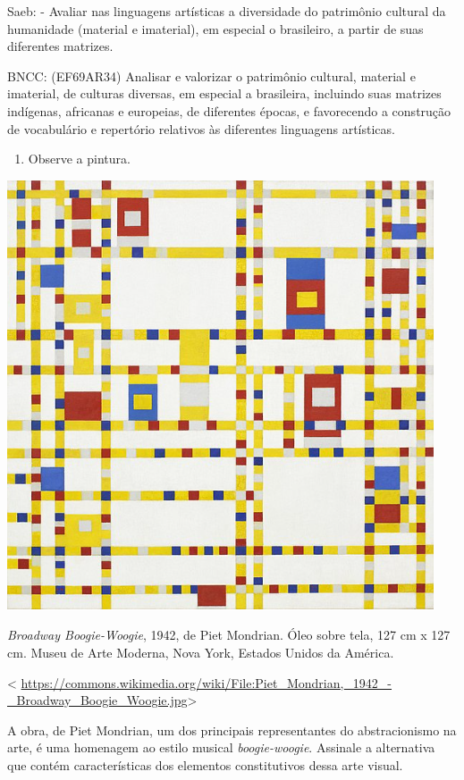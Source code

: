 \begin{escolha}
{{{{{{{{Saeb: - Avaliar nas linguagens artísticas a diversidade do patrimônio
cultural da humanidade (material e imaterial), em especial o brasileiro,
a partir de suas diferentes matrizes.

BNCC: (EF69AR34) Analisar e valorizar o patrimônio cultural, material e
imaterial, de culturas diversas, em especial a brasileira, incluindo
suas matrizes indígenas, africanas e europeias, de diferentes épocas, e
favorecendo a construção de vocabulário e repertório relativos às
diferentes linguagens artísticas.

\begin{enumerate}
\def\labelenumi{\arabic{enumi}.}
\item
  Observe a pintura.
\end{enumerate}

\includegraphics[width=4.96875in,height=5.01042in]{media/image40.png}

\emph{Broadway Boogie-Woogie}, 1942, de Piet Mondrian. Óleo sobre tela,
127 cm x 127 cm. Museu de Arte Moderna, Nova York, Estados Unidos da
América.

\textless{}
\url{https://commons.wikimedia.org/wiki/File:Piet_Mondrian,_1942_-_Broadway_Boogie_Woogie.jpg}\textgreater{}

A obra, de Piet Mondrian, um dos principais representantes do
abstracionismo na arte, é uma homenagem ao estilo musical
\emph{boogie-woogie}. Assinale a alternativa que contém características
dos elementos constitutivos dessa arte visual.

}}}}}}}}
\end{escolha}
